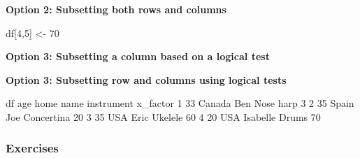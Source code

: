\documentclass[
]{book}
\newenvironment{Shaded}{\begin{snugshade}}{\end{snugshade}}
\newcommand{\DecValTok}[1]{\textcolor[rgb]{0.00,0.00,0.81}{#1}}
\newcommand{\FunctionTok}[1]{\textcolor[rgb]{0.00,0.00,0.00}{#1}}
\newcommand{\NormalTok}[1]{#1}
\newcommand{\OtherTok}[1]{\textcolor[rgb]{0.56,0.35,0.01}{#1}}
\newcommand{\SpecialCharTok}[1]{\textcolor[rgb]{0.00,0.00,0.00}{#1}}
\newcommand{\StringTok}[1]{\textcolor[rgb]{0.31,0.60,0.02}{#1}}
\begin{document}
\textbf{Option 2: Subsetting both rows and columns}

\begin{Shaded}
\begin{Highlighting}[]
\NormalTok{df[}\DecValTok{4}\NormalTok{,}\DecValTok{5}\NormalTok{] }\OtherTok{\textless{}{-}} \DecValTok{70}
\end{Highlighting}
\end{Shaded}

\textbf{Option 3: Subsetting a column based on a logical test}

\begin{Shaded}
\end{Shaded}

\textbf{Option 3: Subsetting row and columns using logical tests}

\begin{Shaded}
\end{Shaded}

\begin{Shaded}
\begin{Highlighting}[]
\NormalTok{df}
\NormalTok{  age   home     name instrument x\_factor}
\DecValTok{1}  \DecValTok{33}\NormalTok{ Canada      Ben  Nose harp        }\DecValTok{3}
\DecValTok{2}  \DecValTok{35}\NormalTok{  Spain      Joe Concertina       }\DecValTok{20}
\DecValTok{3}  \DecValTok{35}\NormalTok{    USA     Eric    Ukelele       }\DecValTok{60}
\DecValTok{4}  \DecValTok{20}\NormalTok{    USA Isabelle      Drums       }\DecValTok{70}
\end{Highlighting}
\end{Shaded}

\hypertarget{exercises-3}{%
\subsubsection*{Exercises}\label{exercises-3}}
\end{document}
